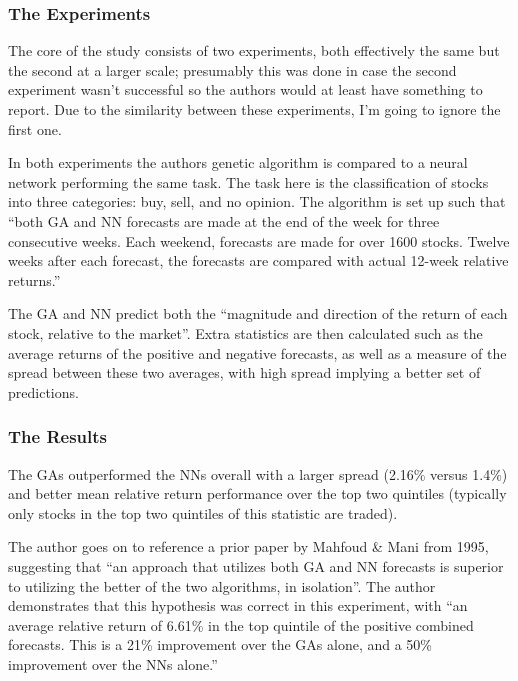 \subsubsection{The Experiments}

The core of the study consists of two experiments, both effectively the same but the second at a larger scale; presumably this was done in case the second experiment wasn't successful so the authors would at least have something to report. Due to the similarity between these experiments, I'm going to ignore the first one. \newline

In both experiments the authors genetic algorithm is compared to a neural network performing the same task. The task here is the classification of stocks into three categories: buy, sell, and no opinion. The algorithm is set up such that ``both GA and NN forecasts are made at the end of the week for three consecutive weeks. Each weekend, forecasts are made for over 1600 stocks. Twelve weeks after each forecast, the forecasts are compared with actual 12-week relative returns.'' \newline

The GA and NN predict both the ``magnitude and direction of the return of each stock, relative to the market''. Extra statistics are then calculated such as the average returns of the positive and negative forecasts, as well as a measure of the spread between these two averages, with high spread implying a better set of predictions.

\subsubsection{The Results}

The GAs outperformed the NNs overall with a larger spread (2.16\% versus 1.4\%) and better mean relative return performance over the top two quintiles (typically only stocks in the top two quintiles of this statistic are traded). \newline

The author goes on to reference a prior paper by Mahfoud \& Mani from 1995, suggesting that ``an approach that utilizes both GA and NN forecasts is superior to utilizing the better of the two algorithms, in isolation''. The author demonstrates that this hypothesis was correct in this experiment, with ``an average relative return of 6.61\% in the top quintile of the positive combined forecasts. This is a 21\% improvement over the GAs alone, and a 50\% improvement over the NNs alone.''

